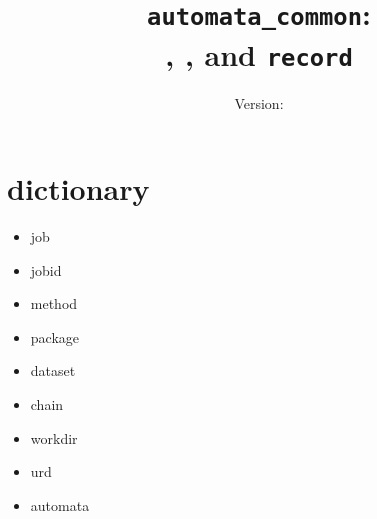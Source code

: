 \documentclass[a4paper]{report}
\title{\texttt{automata\_common}:\\ \jobtuple, \joblist, and \texttt{record}}
\author{Version: \inputfile{gitrevision}}
\date{}
\begin{document}




%

\section{dictionary}
\begin{itemize}
\item job
\item jobid
\item method
\item package
\item dataset
\item chain
\item workdir
\item urd
\item automata
\end{itemize}
\end{document}

